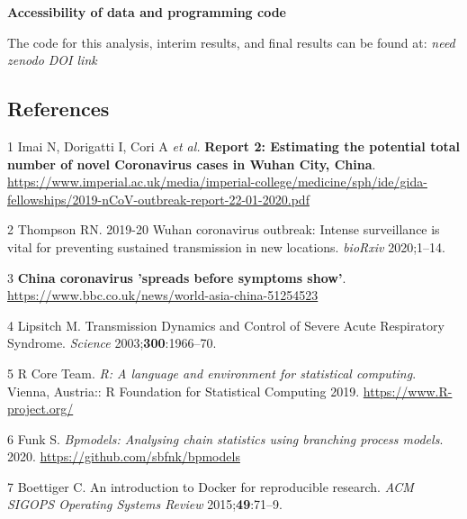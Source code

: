 \documentclass[]{article}
\begin{document}
\textbf{Accessibility of data and programming code}

The code for this analysis, interim results, and final results can be
found at: \emph{need zenodo DOI link}

\hypertarget{references}{%
\subsection{References}\label{references}}

\hypertarget{refs}{}
\leavevmode\hypertarget{ref-Imai:webreport}{}%
1 Imai N, Dorigatti I, Cori A \emph{et al.} \textbf{Report 2: Estimating
the potential total number of novel Coronavirus cases in Wuhan City,
China}.
\url{https://www.imperial.ac.uk/media/imperial-college/medicine/sph/ide/gida-fellowships/2019-nCoV-outbreak-report-22-01-2020.pdf}

\leavevmode\hypertarget{ref-Thompson:2020bc}{}%
2 Thompson RN. 2019-20 Wuhan coronavirus outbreak: Intense surveillance
is vital for preventing sustained transmission in new locations.
\emph{bioRxiv} 2020;1--14.

\leavevmode\hypertarget{ref-bbc:wuhan:report}{}%
3 \textbf{China coronavirus 'spreads before symptoms show'}.
\url{https://www.bbc.co.uk/news/world-asia-china-51254523}

\leavevmode\hypertarget{ref-Lipsitch:2003}{}%
4 Lipsitch M. Transmission Dynamics and Control of Severe Acute
Respiratory Syndrome. \emph{Science} 2003;\textbf{300}:1966--70.

\leavevmode\hypertarget{ref-R}{}%
5 R Core Team. \emph{R: A language and environment for statistical
computing}. Vienna, Austria:: R Foundation for Statistical Computing
2019. \url{https://www.R-project.org/}

\leavevmode\hypertarget{ref-bpmodels}{}%
6 Funk S. \emph{Bpmodels: Analysing chain statistics using branching
process models}. 2020. \url{https://github.com/sbfnk/bpmodels}

\leavevmode\hypertarget{ref-Boettiger:2015dw}{}%
7 Boettiger C. An introduction to Docker for reproducible research.
\emph{ACM SIGOPS Operating Systems Review} 2015;\textbf{49}:71--9.
\end{document}
